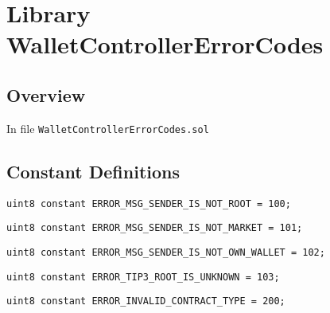 
\chapter{Library WalletControllerErrorCodes}

\minitoc

\section{Overview}


In file {\tt WalletControllerErrorCodes.sol}

\section{Constant Definitions}


\begin{lstlisting}[firstnumber=4]
    uint8 constant ERROR_MSG_SENDER_IS_NOT_ROOT = 100;
\end{lstlisting}

\begin{lstlisting}[firstnumber=5]
    uint8 constant ERROR_MSG_SENDER_IS_NOT_MARKET = 101;
\end{lstlisting}

\begin{lstlisting}[firstnumber=6]
    uint8 constant ERROR_MSG_SENDER_IS_NOT_OWN_WALLET = 102;
\end{lstlisting}

\begin{lstlisting}[firstnumber=7]
    uint8 constant ERROR_TIP3_ROOT_IS_UNKNOWN = 103;
\end{lstlisting}

\begin{lstlisting}[firstnumber=9]
    uint8 constant ERROR_INVALID_CONTRACT_TYPE = 200;
\end{lstlisting}
